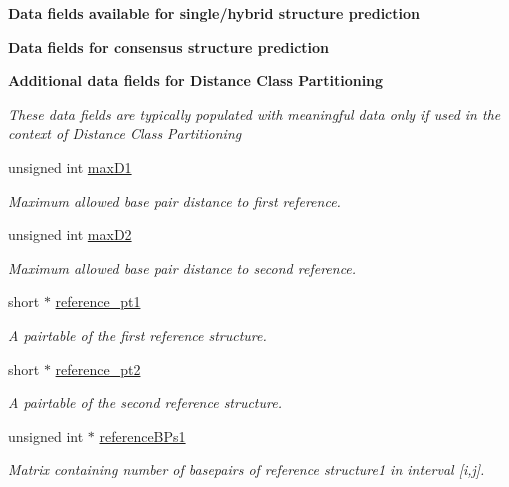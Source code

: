 \begin{Indent}\textbf{ Data fields available for single/hybrid structure prediction}\par
\end{Indent}
\begin{Indent}\textbf{ Data fields for consensus structure prediction}\par
\end{Indent}
\begin{Indent}\textbf{ Additional data fields for Distance Class Partitioning}\par
{\em These data fields are typically populated with meaningful data only if used in the context of Distance Class Partitioning }\begin{DoxyCompactItemize}
\item 
unsigned int \mbox{\hyperlink{group__fold__compound_a426305721b16023f2f3247f7354d2c46}{max\+D1}}
\begin{DoxyCompactList}\small\item\em Maximum allowed base pair distance to first reference. \end{DoxyCompactList}\item 
unsigned int \mbox{\hyperlink{group__fold__compound_a38695774fd396c892f9a70d39978b231}{max\+D2}}
\begin{DoxyCompactList}\small\item\em Maximum allowed base pair distance to second reference. \end{DoxyCompactList}\item 
short $\ast$ \mbox{\hyperlink{group__fold__compound_aa279ba4bd0ff541d435d3a049687f3ac}{reference\+\_\+pt1}}
\begin{DoxyCompactList}\small\item\em A pairtable of the first reference structure. \end{DoxyCompactList}\item 
short $\ast$ \mbox{\hyperlink{group__fold__compound_a926ad253f5f0eed642bc227493d0278d}{reference\+\_\+pt2}}
\begin{DoxyCompactList}\small\item\em A pairtable of the second reference structure. \end{DoxyCompactList}\item 
unsigned int $\ast$ \mbox{\hyperlink{group__fold__compound_a62a8d4ab8dadffbf09da917adff6c71e}{reference\+B\+Ps1}}
\begin{DoxyCompactList}\small\item\em Matrix containing number of basepairs of reference structure1 in interval \mbox{[}i,j\mbox{]}. \end{DoxyCompactList}\item 

\end{DoxyCompactItemize}
\end{Indent}

